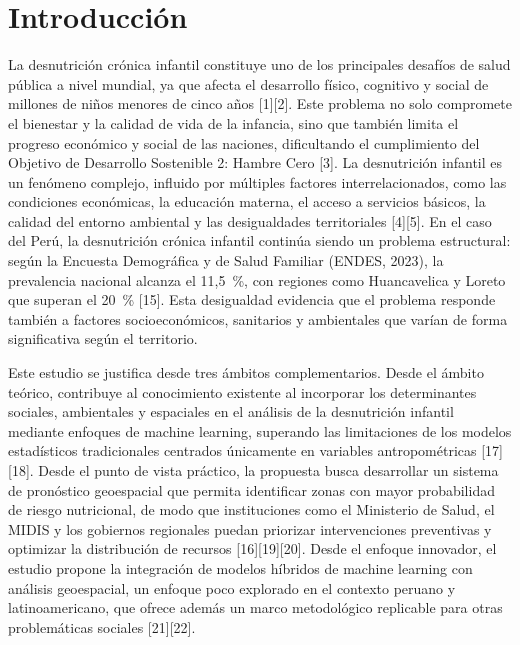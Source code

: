 \documentclass[final,5p,times,twocolumn,authoryear,lefttitle]{elsarticle}
\begin{document}


\section{Introducción}
\label{introduction}

La desnutrición crónica infantil constituye uno de los principales desafíos de salud pública a nivel mundial, ya que afecta el desarrollo físico, cognitivo y social de millones de niños menores de cinco años [1][2]. Este problema no solo compromete el bienestar y la calidad de vida de la infancia, sino que también limita el progreso económico y social de las naciones, dificultando el cumplimiento del Objetivo de Desarrollo Sostenible 2: Hambre Cero [3]. La desnutrición infantil es un fenómeno complejo, influido por múltiples factores interrelacionados, como las condiciones económicas, la educación materna, el acceso a servicios básicos, la calidad del entorno ambiental y las desigualdades territoriales [4][5]. En el caso del Perú, la desnutrición crónica infantil continúa siendo un problema estructural: según la Encuesta Demográfica y de Salud Familiar (ENDES, 2023), la prevalencia nacional alcanza el 11,5~\%, con regiones como Huancavelica y Loreto que superan el 20~\% [15]. Esta desigualdad evidencia que el problema responde también a factores socioeconómicos, sanitarios y ambientales que varían de forma significativa según el territorio.

Este estudio se justifica desde tres ámbitos complementarios. Desde el ámbito teórico, contribuye al conocimiento existente al incorporar los determinantes sociales, ambientales y espaciales en el análisis de la desnutrición infantil mediante enfoques de machine learning, superando las limitaciones de los modelos estadísticos tradicionales centrados únicamente en variables antropométricas [17][18]. Desde el punto de vista práctico, la propuesta busca desarrollar un sistema de pronóstico geoespacial que permita identificar zonas con mayor probabilidad de riesgo nutricional, de modo que instituciones como el Ministerio de Salud, el MIDIS y los gobiernos regionales puedan priorizar intervenciones preventivas y optimizar la distribución de recursos [16][19][20]. Desde el enfoque innovador, el estudio propone la integración de modelos híbridos de machine learning con análisis geoespacial, un enfoque poco explorado en el contexto peruano y latinoamericano, que ofrece además un marco metodológico replicable para otras problemáticas sociales [21][22].
\end{document}
